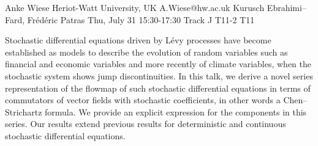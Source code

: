 \begin{talk}
  {Anke Wiese}%
  {Heriot-Watt University, UK}%
  {A.Wiese@hw.ac.uk}%
  {Kurusch Ebrahimi--Fard, Fr{\'e}d{\'e}ric Patras}%
  {}%
  {}%
  {Thu, July 31 15:30-17:30 Track J}%
  {T11-2}%
  {T11}%
  
				

Stochastic differential equations driven by L{\'e}vy processes have become established as models to describe the evolution of random variables such as financial and economic variables and more recently of climate variables, when the stochastic system shows jump discontinuities. In this talk, we derive a novel series representation of the flowmap of such stochastic 
differential equations 
in terms of commutators of vector fields with stochastic 
coefficients, in other words a Chen--Strichartz formula. We provide an explicit expression for the components in this series. 
Our results extend previous results
for deterministic and continuous stochastic differential equations.		
\end{talk}

